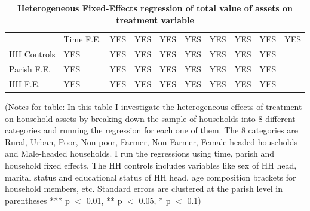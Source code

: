 \documentclass[12pt]{article}
\begin{document}
{\begin{table}
\begin{tabular}{lllllllll}
&
Time F.E. & YES & YES & YES & YES & YES & YES & YES & YES \\
HH Controls & YES & YES & YES & YES & YES & YES & YES & YES  \\
Parish F.E. & YES & YES & YES & YES & YES & YES & YES & YES  \\
 HH F.E. & YES & YES & YES & YES & YES & YES & YES & YES  \\ \hline
{}
\end{tabular}
\caption{\bfseries Heterogeneous Fixed-Effects regression of total value of assets on treatment variable}
\label{table:heterogeneity assets}
\footnotesize{(Notes for table: In this table I investigate the heterogeneous effects of treatment on household assets by breaking down the sample of households into 8 different categories and running the regression for each one of them. The 8 categories are Rural, Urban, Poor, Non-poor, Farmer, Non-Farmer, Female-headed households and Male-headed households. I run the regressions using time, parish and household fixed effects. The HH controls includes variables like sex of HH head, marital status and educational status of HH head, age composition brackets for household members, etc. Standard errors are clustered at the parish level in parentheses 
*** p $<$ 0.01, ** p $<$ 0.05, * p $<$ 0.1)}
\end{table}


}
\end{document}
